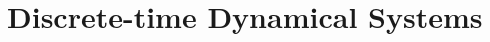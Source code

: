 \documentclass[12 pt]{article}
\begin{document}
\section{Discrete-time Dynamical Systems}\label{ch2}



\end{document}
